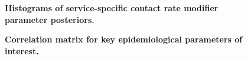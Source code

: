 \begin{figure}[ht]
    \caption{\textbf{Histograms of service-specific contact rate modifier parameter posteriors.}}
\end{figure}

\begin{figure}[ht]
\caption{\textbf{Correlation matrix for key epidemiological parameters of interest.}}
\end{figure}

